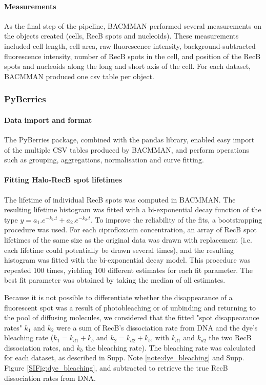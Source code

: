 \paragraph*{Measurements}
As the final step of the pipeline, BACMMAN performed several measurements on the objects created (cells, RecB spots and nucleoids). These measurements included cell length, cell area, raw fluorescence intensity, background-subtracted fluorescence intensity, number of RecB spots in the cell, and position of the RecB spots and nucleoids along the long and short axis of the cell. For each dataset, BACMMAN produced one csv table per object.

\subsubsection*{PyBerries}
\paragraph*{Data import and format}
The PyBerries package, combined with the pandas library, enabled easy import of the multiple CSV tables produced by BACMMAN, and perform operations such as grouping, aggregations, normalisation and curve fitting.

\paragraph*{Fitting Halo-RecB spot lifetimes}
The lifetime of individual Rec\-B spots was computed in BACMMAN. The resulting lifetime histogram was fitted with a bi-exponential decay function of the type $y=a_1.e^{-k_1.t} + a_2.e^{-k_2.t}$. To improve the reliability of the fits, a bootstrapping procedure was used. For each ciprofloxacin concentration, an array of RecB spot lifetimes of the same size as the original data was drawn with replacement (i.e. each lifetime could potentially be drawn several times), and the resulting histogram was fitted with the bi-exponential decay model. This procedure was repeated 100 times, yielding 100 different estimates for each fit parameter. The best fit parameter was obtained by taking the median of all estimates.

Because it is not possible to differentiate whether the disappearance of a fluorescent spot was a result of photobleaching or of unbinding and returning to the pool of diffusing molecules, we considered that the fitted "spot disappearance rates" $k_1$ and $k_2$ were a sum of RecB's dissociation rate from DNA and the dye's bleaching rate ($k_1=k_{d1}+k_b$ and $k_2=k_{d2}+k_b$, with $k_{d1}$ and $k_{d2}$ the two RecB dissociation rates, and $k_b$ the bleaching rate). The bleaching rate was calculated for each dataset, as described in Supp. Note \ref{note:dye_bleaching} and Supp. Figure \ref{SIFig:dye_bleaching}, and subtracted to retrieve the true RecB dissociation rates from DNA.

